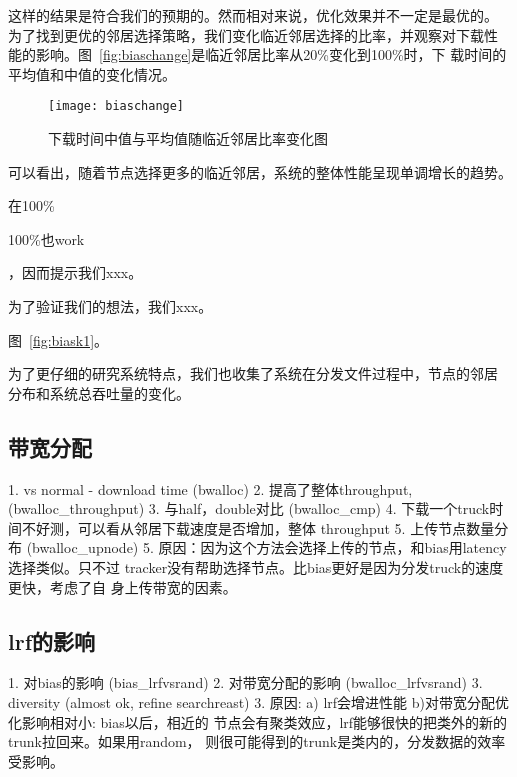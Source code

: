 这样的结果是符合我们的预期的。然而相对来说，优化效果并不一定是最优的。
为了找到更优的邻居选择策略，我们变化临近邻居选择的比率，并观察对下载性
能的影响。图~\ref{fig:biaschange}是临近邻居比率从20\%变化到100\%时，下
载时间的平均值和中值的变化情况。

\begin{figure}
  \centering
  \begin{minipage}{0.8\linewidth}
    \centering
    \texttt{[image: biaschange]}
    \caption{下载时间中值与平均值随临近邻居比率变化图}
    \label{fig:bias80}
  \end{minipage}
\end{figure}

可以看出，随着节点选择更多的临近邻居，系统的整体性能呈现单调增长的趋势。



在100\%


100\%也work

，因而提示我们xxx。

为了验证我们的想法，我们xxx。

图~\ref{fig:biask1}。

为了更仔细的研究系统特点，我们也收集了系统在分发文件过程中，节点的邻居
分布和系统总吞吐量的变化。


\subsection{带宽分配}
1. vs normal - download time (bwalloc)
2. 提高了整体throughput, (bwalloc\_throughput)
3. 与half，double对比 (bwalloc\_cmp)
4. 下载一个truck时间不好测，可以看从邻居下载速度是否增加，整体
throughput
5. 上传节点数量分布 (bwalloc\_upnode)
5. 原因：因为这个方法会选择上传的节点，和bias用latency选择类似。只不过
tracker没有帮助选择节点。比bias更好是因为分发truck的速度更快，考虑了自
身上传带宽的因素。

\subsection{lrf的影响}
1. 对bias的影响 (bias\_lrfvsrand)
2. 对带宽分配的影响 (bwalloc\_lrfvsrand)
3. diversity (almost ok, refine searchreast)
3. 原因: a) lrf会增进性能 b)对带宽分配优化影响相对小: bias以后，相近的
节点会有聚类效应，lrf能够很快的把类外的新的trunk拉回来。如果用random，
则很可能得到的trunk是类内的，分发数据的效率受影响。


